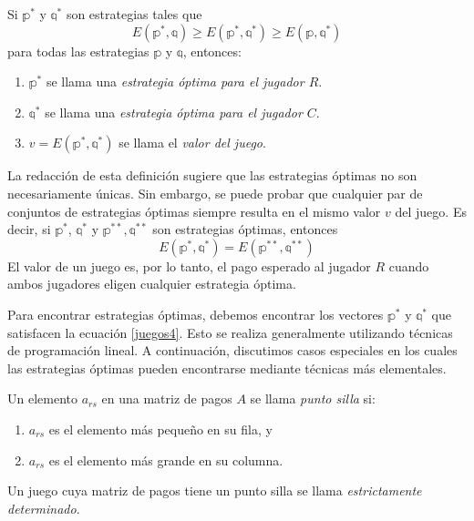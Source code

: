 \begin{definicion}{}{}
    Si $\mathbb{p}^*$ y $\mathbb{q}^*$ son estrategias tales que
    \begin{equation}
        E(\mathbb{p}^*, \mathbb{q}) \geq E(\mathbb{p}^*, \mathbb{q}^*) \geq E(\mathbb{p}, \mathbb{q}^*) \label{juegos4}
    \end{equation}
    para todas las estrategias $\mathbb{p}$ y $\mathbb{q}$, entonces:
    \begin{enumerate}[label=\roman*), topsep=6pt, itemsep=0pt]
        \item $\mathbb{p}^*$ se llama una \emph{estrategia óptima para el jugador $R$}.
        \item $\mathbb{q}^*$ se llama una \emph{estrategia óptima para el jugador $C$}.
        \item $v = E(\mathbb{p}^*, \mathbb{q}^*)$ se llama el \emph{valor del juego}.
    \end{enumerate}
\end{definicion}

La redacción de esta definición sugiere que las estrategias óptimas no son necesariamente únicas. Sin embargo, se puede probar que cualquier par de conjuntos de estrategias óptimas siempre resulta en el mismo valor $v$ del juego. Es decir, si $\mathbb{p}^*$, $\mathbb{q}^*$ y $\mathbb{p}^{**}, \mathbb{q}^{**}$ son estrategias óptimas, entonces
\begin{equation}
    E(\mathbb{p}^*, \mathbb{q}^*) = E(\mathbb{p}^{**}, \mathbb{q}^{**}) \label{juegos5}
\end{equation}\newpage\noindent
El valor de un juego es, por lo tanto, el pago esperado al jugador $R$ cuando ambos jugadores eligen cualquier estrategia óptima.

Para encontrar estrategias óptimas, debemos encontrar los vectores $\mathbb{p}^*$ y $\mathbb{q}^*$ que satisfacen la ecuación \eqref{juegos4}. Esto se realiza generalmente utilizando técnicas de programación lineal. A continuación, discutimos casos especiales en los cuales las estrategias óptimas pueden encontrarse mediante técnicas más elementales.

\begin{definicion}{}{}
    Un elemento $a_{rs}$ en una matriz de pagos $A$ se llama \emph{punto silla} si:
    \begin{enumerate}[label=\roman*), topsep=6pt, itemsep=0pt]
        \item $a_{rs}$ es el elemento más pequeño en su fila, y
        \item $a_{rs}$ es el elemento más grande en su columna.
    \end{enumerate}
    Un juego cuya matriz de pagos tiene un punto silla se llama \emph{estrictamente determinado}.
\end{definicion}

